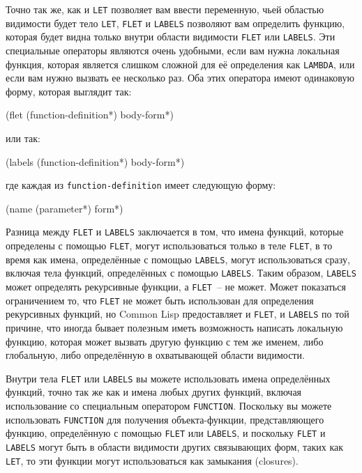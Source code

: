 Точно так же, как и \lstinline{LET} позволяет вам ввести переменную, чьей областью видимости
будет тело \lstinline{LET}, \lstinline{FLET} и \lstinline{LABELS} позволяют вам определить функцию,
которая будет видна только внутри области видимости \lstinline{FLET} или \lstinline{LABELS}.  Эти
специальные операторы являются очень удобными, если вам нужна локальная функция, которая
является слишком сложной для её определения как \lstinline{LAMBDA}, или если вам нужно вызвать
ее несколько раз.  Оба этих оператора имеют одинаковую форму, которая выглядит так:

\begin{myverb}
(flet (function-definition*)
  body-form*)
\end{myverb}

\noindent{}или так:

\begin{myverb}
(labels (function-definition*)
  body-form*)
\end{myverb}

\noindent{}где каждая из \lstinline{function-definition} имеет следующую форму:

\begin{myverb}
(name (parameter*) form*)
\end{myverb}

Разница между \lstinline{FLET} и \lstinline{LABELS} заключается в том, что имена функций, которые
определены с помощью \lstinline{FLET}, могут использоваться только в теле \lstinline{FLET}, в то
время как имена, определённые с помощью \lstinline{LABELS}, могут использоваться сразу, включая
тела функций, определённых с помощью \lstinline{LABELS}. Таким образом, \lstinline{LABELS} может
определять рекурсивные функции, а \lstinline{FLET}~-- не может.  Может показаться ограничением
то, что \lstinline{FLET} не может быть использован для определения рекурсивных функций, но
Common Lisp предоставляет и \lstinline{FLET}, и \lstinline{LABELS} по той причине, что иногда бывает
полезным иметь возможность написать локальную функцию, которая может вызвать другую функцию
с тем же именем, либо глобальную, либо определённую в охватывающей области видимости.

Внутри тела \lstinline{FLET} или \lstinline{LABELS} вы можете использовать имена определённых
функций, точно так же как и имена любых других функций, включая использование со
спе\-циаль\-ным оператором \lstinline{FUNCTION}.  Поскольку вы можете использовать \lstinline{FUNCTION}
для получения объекта-функции, представляющего функцию, определённую с помощью \lstinline{FLET}
или \lstinline{LABELS}, и поскольку \lstinline{FLET} и \lstinline{LABELS} могут быть в области видимости
других связывающих форм, таких как \lstinline{LET}, то эти функции могут использоваться как
замыкания (closures).

